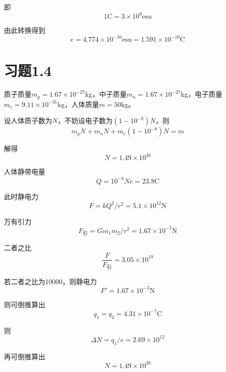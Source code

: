 \documentclass{SCIS2020cn}
\begin{document}
即
\begin{equation}
    1\text{C}=3×10^9{\text{esu}}
\end{equation}

由此转换得到
\begin{equation}
    e=4.774×10^{-10}\text{esu}=1.591×10^{-19}\text{C}
\end{equation}

\section{习题1.4}
质子质量$m_p=1.67×10^{-27}$kg，中子质量$m_n=1.67×10^{-27}$kg，电子质量$m_e=9.11×10^{-31}$kg，人体质量$m=50$kg。

设人体质子数为$N$，不妨设电子数为$(1-10^{-8})N$，则
\begin{equation}
    m_pN+m_nN+m_e(1-10^{-8})N=m
\end{equation}

解得
\begin{equation}
    N=1.49×10^{28}
\end{equation}


人体静带电量
\begin{equation}
    Q=10^{-8}Ne=23.8\text{C}
\end{equation}

此时静电力
\begin{equation}
    F=kQ^2/r^2=5.1×10^{12}\text{N}
\end{equation}

万有引力
\begin{equation}
    F_\text{引}=Gm_1m_2/r^2=1.67×10^{-7}\text{N}
\end{equation}

二者之比
\begin{equation}
    \displaystyle\frac{F}{F_{\text{引}}}=3.05×10^{19}
\end{equation}


若二者之比为10000，则静电力
\begin{equation}
    F'=1.67×10^{-3}\text{N}
\end{equation}

则可倒推算出
\begin{equation}
    q_1=q_2=4.31×10^{-7}\text{C}
\end{equation}

则
\begin{equation}
    \Delta{N}=q_1/e=2.69×10^{12}
\end{equation}

再可倒推算出
\begin{equation}
    N=1.49×10^{28}
\end{equation}
\end{document}
